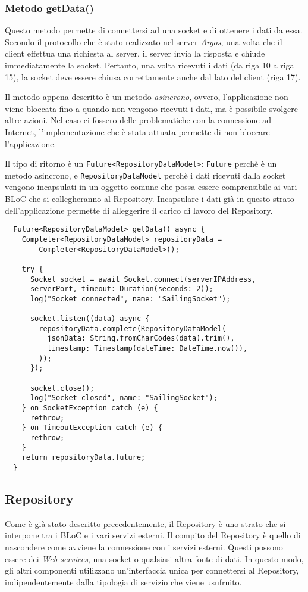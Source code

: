 \subsubsection{Metodo getData()}
Questo metodo permette di connettersi ad una socket e di ottenere i dati da essa. Secondo il protocollo che è stato realizzato nel server \textit{Argos}, una volta che il client effettua una richiesta al server, il server invia la risposta e chiude immediatamente la socket. Pertanto, una volta ricevuti i dati (da riga 10 a riga 15), la socket deve essere chiusa correttamente anche dal lato del client (riga 17).

Il metodo appena descritto è un metodo \textit{asincrono}, ovvero, l'applicazione non viene bloccata fino a quando non vengono ricevuti i dati, ma è possibile svolgere altre azioni. Nel caso ci fossero delle problematiche con la connessione ad Internet, l'implementazione che è stata attuata permette di non bloccare l'applicazione.

Il tipo di ritorno è un \verb|Future<RepositoryDataModel>|: \verb|Future| perchè è un metodo asincrono, e \verb|RepositoryDataModel| perchè i dati ricevuti dalla socket vengono incapsulati in un oggetto comune che possa essere comprensibile ai vari BLoC che si collegheranno al Repository. Incapsulare i dati già in questo strato dell'applicazione permette di alleggerire il carico di lavoro del Repository.

  \begin{lstlisting}
  Future<RepositoryDataModel> getData() async {
    Completer<RepositoryDataModel> repositoryData =
        Completer<RepositoryDataModel>();

    try {
      Socket socket = await Socket.connect(serverIPAddress, 
      serverPort, timeout: Duration(seconds: 2));
      log("Socket connected", name: "SailingSocket");

      socket.listen((data) async {
        repositoryData.complete(RepositoryDataModel(
          jsonData: String.fromCharCodes(data).trim(),
          timestamp: Timestamp(dateTime: DateTime.now()),
        ));
      });

      socket.close();
      log("Socket closed", name: "SailingSocket");
    } on SocketException catch (e) {
      rethrow;
    } on TimeoutException catch (e) {
      rethrow;
    }
    return repositoryData.future;
  }
  \end{lstlisting}

\subsection{Repository}
Come è già stato descritto precedentemente, il Repository è uno strato che si interpone tra i BLoC e i vari servizi esterni. Il compito del Repository è quello di nascondere come avviene la connessione con i servizi esterni. Questi possono essere dei \textit{Web services}, una socket o qualsiasi altra fonte di dati. In questo modo, gli altri componenti utilizzano un'interfaccia unica per connettersi al Repository, indipendentemente dalla tipologia di servizio che viene usufruito.

